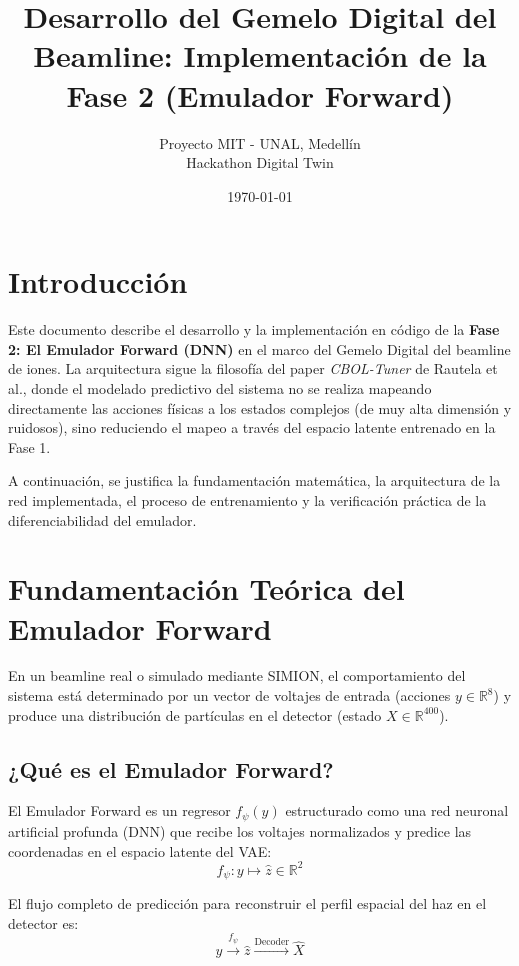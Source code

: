 \documentclass[12pt,letterpaper]{article}
\title{\textbf{Desarrollo del Gemelo Digital del Beamline: Implementación de la Fase 2 (Emulador Forward)}}
\author{Proyecto MIT - UNAL, Medellín \\ Hackathon Digital Twin}
\date{\today}
\begin{document}
\maketitle

\tableofcontents
\newpage

\section{Introducción}
Este documento describe el desarrollo y la implementación en código de la \textbf{Fase 2: El Emulador Forward (DNN)} en el marco del Gemelo Digital del beamline de iones. La arquitectura sigue la filosofía del paper \textit{CBOL-Tuner} de Rautela et al., donde el modelado predictivo del sistema no se realiza mapeando directamente las acciones físicas a los estados complejos (de muy alta dimensión y ruidosos), sino reduciendo el mapeo a través del espacio latente entrenado en la Fase 1.

A continuación, se justifica la fundamentación matemática, la arquitectura de la red implementada, el proceso de entrenamiento y la verificación práctica de la diferenciabilidad del emulador.

\section{Fundamentación Teórica del Emulador Forward}
En un beamline real o simulado mediante SIMION, el comportamiento del sistema está determinado por un vector de voltajes de entrada (acciones $y \in \mathbb{R}^8$) y produce una distribución de partículas en el detector (estado $X \in \mathbb{R}^{400}$).

\subsection{¿Qué es el Emulador Forward?}
El Emulador Forward es un regresor $f_\psi(y)$ estructurado como una red neuronal artificial profunda (DNN) que recibe los voltajes normalizados y predice las coordenadas en el espacio latente del VAE:
\begin{equation}
    f_\psi: y \mapsto \hat{z} \in \mathbb{R}^2
\end{equation}

El flujo completo de predicción para reconstruir el perfil espacial del haz en el detector es:
\begin{equation}
    y \xrightarrow{f_\psi} \hat{z} \xrightarrow{\text{Decoder}} \hat{X}
\end{equation}
\end{document}
